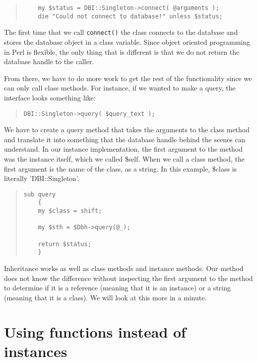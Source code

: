 \begin{quote}    
\begin{verbatim}
    my $status = DBI::Singleton->connect( @arguments );
    die "Could not connect to database!" unless $status;
\end{verbatim}
\end{quote}

The first time that we call {\tt connect()} the class
connects to the database and stores the database object in a
class variable.  Since object oriented programming in Perl
is flexible, the only thing that is different is that we do
not return the database handle to the caller.


From there, we have to do more work to get the rest of the
functionality since we can only call class methods.  For
instance, if we wanted to make a query, the interface looks
something like:

\begin{quote}    
\begin{verbatim}
DBI::Singleton->query( $query_text );
\end{verbatim}
\end{quote}
    
We have to create a query method that takes the arguments to
the class method and translate it into something that the
database handle behind the scenes can understand.  In our
instance implementation, the first argument to the method
was the instance itself, which we called \$self.  When we
call a class method, the first argument is the name of the
class, as a string.  In this example, \$class is literally
'DBI::Singleton'.

\begin{quote}    
\begin{verbatim}
sub query
    {
    my $class = shift;
    
    my $sth = $Dbh->query(@_);
    
    return $status;
    }
\end{verbatim}
\end{quote}

Inheritance works as well as class methods and instance
methods.  Our method does not know the difference without
inspecting the first argument to the method to determine if
it is a reference (meaning that it is an instance) or a
string (meaning that it is a class).  We will look at this
more in a minute.

    \section{Using functions instead of instances}

